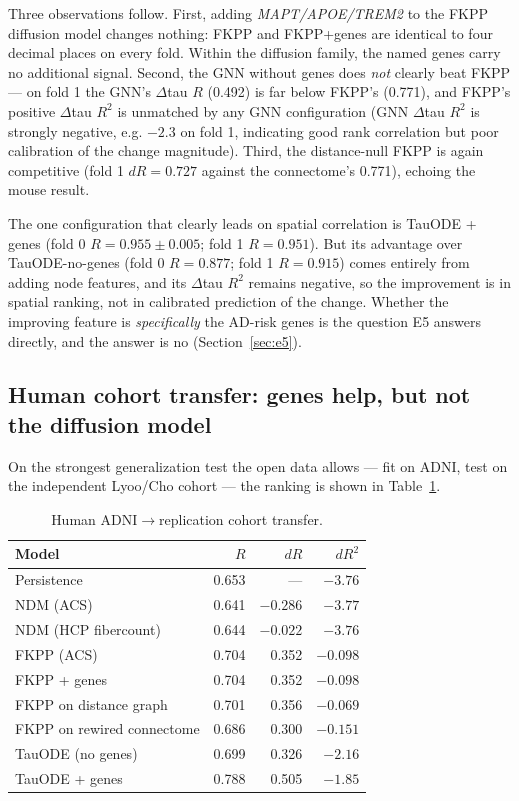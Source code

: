 \documentclass{article}
\begin{document}
Three observations follow. First, adding \textit{MAPT/APOE/TREM2} to the FKPP diffusion model changes nothing: FKPP and FKPP+genes are identical to four decimal places on every fold. Within the diffusion family, the named genes carry no additional signal. Second, the GNN without genes does \textit{not} clearly beat FKPP --- on fold 1 the GNN's $\Delta$tau $R$ (0.492) is far below FKPP's (0.771), and FKPP's positive $\Delta$tau $R^2$ is unmatched by any GNN configuration (GNN $\Delta$tau $R^2$ is strongly negative, e.g. $-2.3$ on fold 1, indicating good rank correlation but poor calibration of the change magnitude). Third, the distance-null FKPP is again competitive (fold 1 $dR = 0.727$ against the connectome's 0.771), echoing the mouse result.

The one configuration that clearly leads on spatial correlation is TauODE + genes (fold 0 $R = 0.955 \pm 0.005$; fold 1 $R = 0.951$). But its advantage over TauODE-no-genes (fold 0 $R = 0.877$; fold 1 $R = 0.915$) comes entirely from adding node features, and its $\Delta$tau $R^2$ remains negative, so the improvement is in spatial ranking, not in calibrated prediction of the change. Whether the improving feature is \textit{specifically} the AD-risk genes is the question E5 answers directly, and the answer is no (Section~\ref{sec:e5}).

\subsection{Human cohort transfer: genes help, but not the diffusion model}

On the strongest generalization test the open data allows --- fit on ADNI, test on the independent Lyoo/Cho cohort --- the ranking is shown in Table~\ref{tab:transfer}.

\begin{table}[t]
  \caption{Human ADNI$\rightarrow$replication cohort transfer.}
  \label{tab:transfer}
  \centering
  \begin{tabular}{lrrr}
    \toprule
    Model & $R$ & $dR$ & $dR^2$ \\
    \midrule
    Persistence               & 0.653 & ---      & $-3.76$ \\
    NDM (ACS)                  & 0.641 & $-0.286$ & $-3.77$ \\
    NDM (HCP fibercount)       & 0.644 & $-0.022$ & $-3.76$ \\
    FKPP (ACS)                 & 0.704 & 0.352    & $-0.098$ \\
    FKPP + genes               & 0.704 & 0.352    & $-0.098$ \\
    FKPP on distance graph     & 0.701 & 0.356    & $-0.069$ \\
    FKPP on rewired connectome & 0.686 & 0.300    & $-0.151$ \\
    TauODE (no genes)          & 0.699 & 0.326    & $-2.16$ \\
    TauODE + genes             & 0.788 & 0.505    & $-1.85$ \\
    \bottomrule
  \end{tabular}
\end{table}
\end{document}
